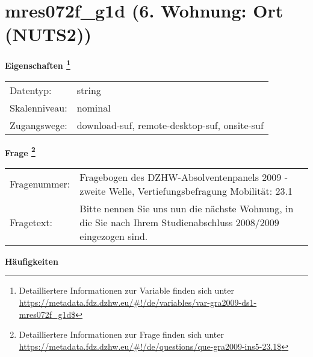 
    \setcounter{footnote}{0}

    \vspace*{-1.8cm}
	\section{mres072f\_g1d (6. Wohnung: Ort (NUTS2))}
	\label{section:mres072f_g1d}



    \vspace*{0.5cm}
    \noindent\textbf{Eigenschaften
	\footnote{Detailliertere Informationen zur Variable finden sich unter
		\url{https://metadata.fdz.dzhw.eu/\#!/de/variables/var-gra2009-ds1-mres072f_g1d$}}}\\
	\begin{tabularx}{\hsize}{@{}lX}
	Datentyp: & string \\
	Skalenniveau: & nominal \\
	Zugangswege: &
	  download-suf, 
	  remote-desktop-suf, 
	  onsite-suf
 \\
    \end{tabularx}



				\vspace*{0.5cm}
                \noindent\textbf{Frage
	                \footnote{Detailliertere Informationen zur Frage finden sich unter
		              \url{https://metadata.fdz.dzhw.eu/\#!/de/questions/que-gra2009-ins5-23.1$}}}\\
				\begin{tabularx}{\hsize}{@{}lX}
					Fragenummer: &
					  Fragebogen des DZHW-Absolventenpanels 2009 - zweite Welle, Vertiefungsbefragung Mobilität:
					  23.1
 \\
					Fragetext: & Bitte nennen Sie uns nun die nächste Wohnung, in die Sie nach Ihrem Studienabschluss 2008/2009 eingezogen sind. \\
				\end{tabularx}





        		\vspace*{0.5cm}
                \noindent\textbf{Häufigkeiten}

